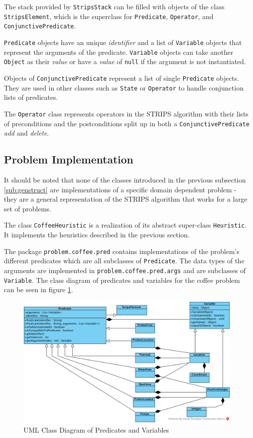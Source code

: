 The stack provided by \texttt{StripsStack} can be filled with objects of the class \texttt{StripsElement}, which is the superclass for \texttt{Predicate}, \texttt{Operator}, and \texttt{ConjunctivePredicate}. 

\texttt{Predicate} objects have an unique \textit{identifier} and a list of \texttt{Variable} objects that represent the arguments of the predicate. \texttt{Variable} objects can take another \texttt{Object} as their \textit{value} or have a \textit{value} of \texttt{null} if the argument is not instantiated. 


Objects of \texttt{ConjunctivePredicate} represent a list of single \texttt{Predicate} objects. They are used in other classes such as \texttt{State} or \texttt{Operator} to handle conjunction lists of predicates.

The \texttt{Operator} class represents operators in the STRIPS algorithm with their lists of preconditions and the postconditions split up in both a \texttt{ConjunctivePredicate} \textit{add} and \textit{delete}.


\subsection{Problem Implementation}

It should be noted that none of the classes introduced in the previous subsection \ref{sub:genstruct} are implementations of a specific domain dependent problem - they are a general representation of the STRIPS algorithm that works for a large set of problems.

The class \texttt{CoffeeHeuristic} is a realization of its abstract super-class \texttt{Heuristic}. It implements the heuristics described in the previous section.

The package \texttt{problem.coffee.pred} contains implementations of the problem's different predicates which are all subclasses of \texttt{Predicate}. The data types of the arguments are implemented in \texttt{problem.coffee.pred.args} and are subclasses of \texttt{Variable}. The class diagram of predicates and variables for the coffee problem can be seen in figure \ref{fig:uml2}.

\begin{figure}[!hbt]
  \includegraphics[width=1.1\textwidth]{uml/CD2}
  \caption{UML Class Diagram of Predicates and Variables}
  \label{fig:uml2}
\end{figure}

